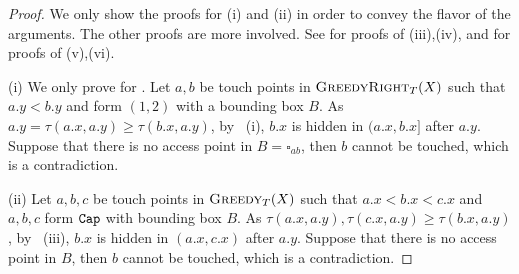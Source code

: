 \begin{proof}
We only show the proofs for (i) and (ii) in order to convey the flavor of the arguments. 
The other proofs are more involved. See  for proofs of (iii),(iv), and  for proofs of (v),(vi).

	(i) We only prove for \GreedyR. Let $a,b$ be touch points
	in $\textsc{GreedyRight}_{T}(X)$ such that $a.y<b.y$ and form $(1,2)$ with
	a bounding box $B$. As $a.y=\tau(a.x,a.y)\ge\tau(b.x,a.y)$, by ~(i),
	$b.x$ is hidden in $(a.x,b.x]$ after $a.y$. 
	Suppose	that there is no access point in $B = \square_{ab}$, then $b$ cannot be touched, which is a contradiction. 
	
	(ii) Let $a,b,c$ be touch points in $\textsc{Greedy}_{T}(X)$ such that $a.x<b.x<c.x$
	and $a,b,c$ form $\texttt{Cap}$ with bounding box $B$. As $\tau(a.x,a.y),\tau(c.x,a.y)\ge\tau(b.x,a.y)$, by ~(iii), 
	$b.x$ is hidden in $(a.x,c.x)$ after $a.y$.
	Suppose that there is no access point in $B$, then $b$ cannot be touched, which is a contradiction. 

\end{proof}

